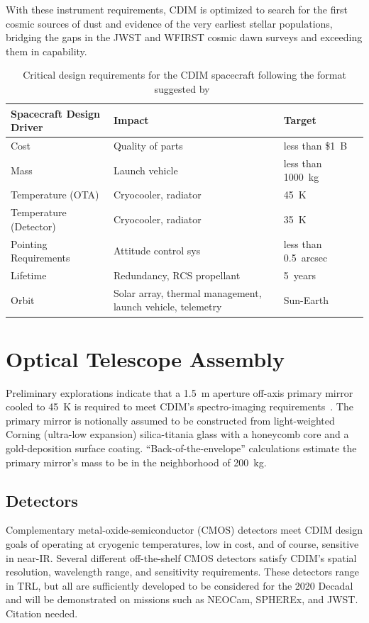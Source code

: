 \documentclass{ws-jai}
\begin{document}
With these instrument requirements, CDIM is optimized to search for the first cosmic sources of dust and evidence of the very earliest stellar populations, bridging the gaps in the JWST and WFIRST cosmic dawn surveys and exceeding them in capability.

\begin{table}
  \caption{Critical design requirements for the CDIM spacecraft following the format suggested by~\citeauthor{smad2015}}
  \small\centering
  \begin{tabular}{@{}llll@{}} \toprule
    Spacecraft Design Driver & Impact & Target \\ \midrule
    Cost & Quality of parts & less than \$\SI{1}{B} \\
    Mass & Launch vehicle & less than \SI{1000}{\kilo\gram} \\
    Temperature (OTA) & Cryocooler, radiator & \SI{45}{\kelvin} \\
    Temperature (Detector) & Cryocooler, radiator & \SI{35}{\kelvin} \\
    Pointing Requirements & Attitude control sys & less than \SI{0.5}{arcsec} \\
    Lifetime & Redundancy, RCS propellant & \SI{5}{years} \\
    Orbit & Solar array, thermal management, launch vehicle, telemetry & Sun-Earth \Ltwo{} \\
    \bottomrule
  \end{tabular}
\label{tab:critical-params}
\end{table}

\section{Optical Telescope Assembly}
\label{sec:ota}
Preliminary explorations indicate that a \SI{1.5}{\meter} aperture off-axis primary mirror cooled to \SI{45}{\kelvin} is required to meet CDIM's spectro-imaging  requirements~\cite{cooray2016cdim2page}.
The primary mirror is notionally assumed to be constructed from light-weighted Corning (ultra-low expansion) silica-titania glass with a honeycomb core and a gold-deposition surface coating.
``Back-of-the-envelope'' calculations estimate the primary mirror's mass to be in the neighborhood of \SI{200}{\kilo\gram}.

\subsection{Detectors}
\label{subSec:detector}
Complementary metal-oxide-semiconductor (CMOS) detectors meet CDIM design goals of operating at cryogenic temperatures, low in cost, and of course, sensitive in near-IR.\@
Several different off-the-shelf CMOS detectors satisfy CDIM's spatial resolution, wavelength range, and sensitivity requirements.
These detectors range in TRL, but all are sufficiently developed to be considered for the 2020 Decadal and will be demonstrated on missions such as NEOCam, SPHEREx, and JWST\@. {\color{red}Citation needed.}
\end{document}
